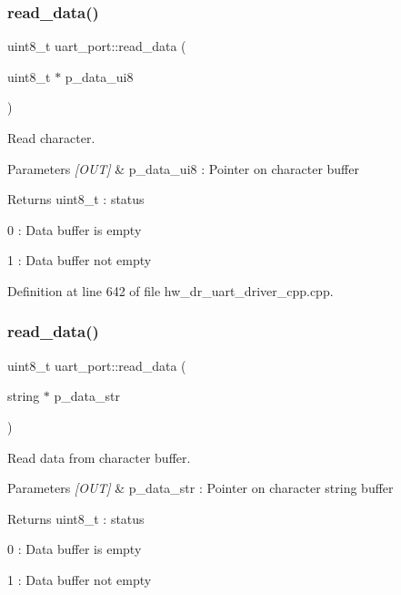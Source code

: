 \subsubsection{read\_data()\hspace{0.1cm}{\footnotesize\ttfamily [1/2]}}
{\footnotesize\ttfamily uint8\+\_\+t uart\+\_\+port\+::read\+\_\+data (\begin{DoxyParamCaption}\item[{uint8\+\_\+t $\ast$}]{p\+\_\+data\+\_\+ui8 }\end{DoxyParamCaption})}



Read character. 


\begin{DoxyParams}{Parameters}
{\em \mbox{[}\+O\+U\+T\mbox{]}} & p\+\_\+data\+\_\+ui8 \+: Pointer on character buffer \\
\hline
\end{DoxyParams}
\begin{DoxyReturn}{Returns}
uint8\+\_\+t \+: status \begin{DoxyItemize}
\item 0 \+: Data buffer is empty \item 1 \+: Data buffer not empty \end{DoxyItemize}

\end{DoxyReturn}


Definition at line 642 of file hw\+\_\+dr\+\_\+uart\+\_\+driver\+\_\+cpp.\+cpp.

\mbox{\label{group___u_a_r_t_ga9089806857881871a090688108e39e95}} 
\subsubsection{read\_data()\hspace{0.1cm}{\footnotesize\ttfamily [2/2]}}
{\footnotesize\ttfamily uint8\+\_\+t uart\+\_\+port\+::read\+\_\+data (\begin{DoxyParamCaption}\item[{string $\ast$}]{p\+\_\+data\+\_\+str }\end{DoxyParamCaption})}



Read data from character buffer. 


\begin{DoxyParams}{Parameters}
{\em \mbox{[}\+O\+U\+T\mbox{]}} & p\+\_\+data\+\_\+str \+: Pointer on character string buffer \\
\hline
\end{DoxyParams}
\begin{DoxyReturn}{Returns}
uint8\+\_\+t \+: status \begin{DoxyItemize}
\item 0 \+: Data buffer is empty \item 1 \+: Data buffer not empty \end{DoxyItemize}

\end{DoxyReturn}


